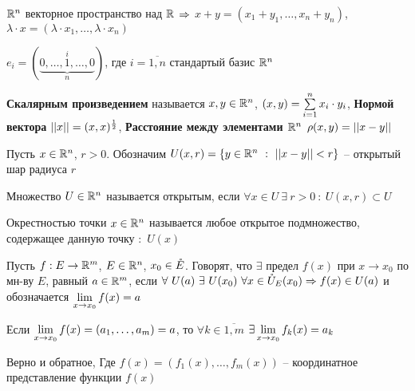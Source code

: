\begin{defs}
	$\mathbb{R}^n$ векторное пространство над $\mathbb{R}$ $\Rightarrow$ $x + y = (x_1+y_1, \ldots, x_{n}+y_{n})$, $\lambda \cdot x = (\lambda \cdot x_1, \ldots, \lambda \cdot x_n)$
\end{defs}

\begin{defs}
	$e_i = (\underbrace{0, \ldots, 1,\ldots,0}_n^i)$, где $i = \overline{1,n}$ стандартый базис $\mathbb{R}^n$
\end{defs}

\begin{defs}
	\textbf{Скалярным произведением} называется $x,y \in \mathbb{R}^n$, $\left( x,y\right) = \sum\limits_{i=1}^{n}x_i \cdot y_i$, \textbf{Нормой вектора} $\left|\left| x\right|\right| = (x,x)^{\frac{1}{2}}$, \textbf{Расстояние между элементами $\mathbb{R}^n$} $\rho(x,y)= \left|\left| x-y\right|\right|$
\end{defs}

\begin{defs}
	Пусть $x \in \mathbb{R}^n$, $r > 0$. Обозначим $U(x,r) = \fskobk{y \in \Rmern{n} \ : \ \DModul{x-y} < r}$ -- открытый шар радиуса $r$
\end{defs}

\begin{defs}
	Множество $U \in \mathbb{R}^n$ называется открытым, если $\forall x \in U \ \exists \ r > 0 \ : \  U(x,r) \subset U$
\end{defs}

\begin{defs}
	Окрестностью точки $x \in \mathbb{R}^n$ называется любое открытое подмножество, содержащее данную точку $:$ $U(x)$
\end{defs}

\begin{defs}
	Пусть $f: E \to \mathbb{R}^m$, $E \in \mathbb{R}^n$, $x_0 \in \mathring{E}$. Говорят, что $\exists$ предел $f(x)$ при $x\to x_0$ по мн-ву $E$, равный $a \in \mathbb{R}^m$, если $\forall \ U(a) \ \exists \ U(x_0) \ \forall x \in \mathring{U}_{E}(x_0) \Rightarrow f(x) \in U(a)$
	и обозначается $\lim\limits_{x \to x_0}f(x)= a$
\end{defs}

\begin{claim}[]
	Если $\lim\limits_{x\to x_0}f(x)=(a_1,\ldots,a_m)=a$, то $\forall k \in \overline{1,m} $ $\exists \lim\limits_{x \to x_0}f_k(x)=a_k$

	Верно и обратное, Где $f(x)=(f_1(x),\ldots,f_m(x))$ -- координатное представление функции $f(x)$

\end{claim}

